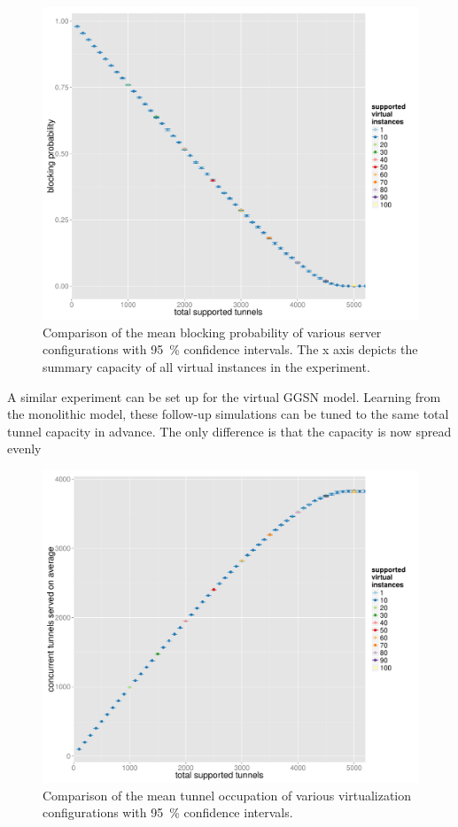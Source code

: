\begin{figure}[htb]
  \centering
  \includegraphics[width=1.0\textwidth]{images/R-virtualized-blocking.pdf}
  \caption{Comparison of the mean blocking probability of various server configurations with \SI{95}{\percent} confidence intervals. The x axis depicts the summary capacity of all virtual instances in the experiment.}
 \label{c4:fig:virtualized_blocking}
\end{figure}

A similar experiment can be set up for the virtual \gls{GGSN} model. Learning from the monolithic model, these follow-up simulations can be tuned to the same total tunnel capacity in advance. The only difference is that the capacity is now spread evenly 

\begin{figure}[htb]
  \centering
  \includegraphics[width=1.0\textwidth]{images/R-virtualized-tunnelusage.pdf}
  \caption{Comparison of the mean tunnel occupation of various virtualization configurations with \SI{95}{\percent} confidence intervals.}
 \label{c4:fig:virtualized_tunnelusage}
\end{figure}

